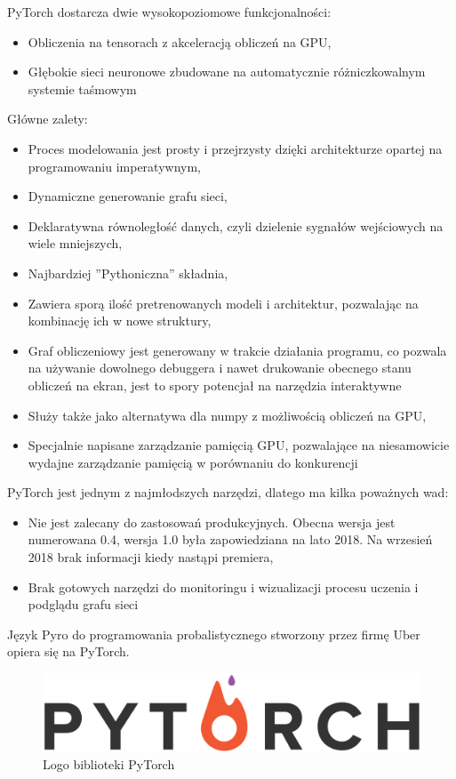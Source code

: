 \documentclass[12pt,a4paper,twoside,titlepage,openright]{book}
\begin{document}
PyTorch dostarcza dwie wysokopoziomowe funkcjonalności:
\begin{itemize}
\item Obliczenia na tensorach z akceleracją obliczeń na GPU,
\item Głębokie sieci neuronowe zbudowane na automatycznie różniczkowalnym systemie taśmowym
\end{itemize}

Główne zalety:
\begin{itemize}
\item Proces modelowania jest prosty i przejrzysty dzięki architekturze opartej na programowaniu imperatywnym,
\item Dynamiczne generowanie grafu sieci,
\item Deklaratywna równoległość danych, czyli dzielenie sygnałów wejściowych na wiele mniejszych,
\item Najbardziej ''Pythoniczna'' składnia,
\item Zawiera sporą ilość pretrenowanych modeli i architektur, pozwalając na kombinację ich w nowe struktury,
\item Graf obliczeniowy jest generowany w trakcie działania programu, co pozwala na używanie dowolnego debuggera i nawet drukowanie obecnego stanu obliczeń na ekran, jest to spory potencjał na narzędzia interaktywne
\item Służy także jako alternatywa dla numpy z możliwością obliczeń na GPU,
\item Specjalnie napisane zarządzanie pamięcią GPU, pozwalające na niesamowicie wydajne zarządzanie pamięcią w porównaniu do konkurencji
\end{itemize}

PyTorch jest jednym z najmłodszych narzędzi, dlatego ma kilka poważnych wad:
\begin{itemize}
\item Nie jest zalecany do zastosowań produkcyjnych. Obecna wersja jest numerowana 0.4, wersja 1.0 była zapowiedziana na lato 2018. Na wrzesień 2018 brak informacji kiedy nastąpi premiera,
\item Brak gotowych narzędzi do monitoringu i wizualizacji procesu uczenia i podglądu grafu sieci
\end{itemize}

Język Pyro do programowania probalistycznego stworzony przez firmę Uber opiera się na PyTorch.

\begin{figure}[h]
	\centering
			\includegraphics[resolution=100, scale=0.3]{PyTorch.png}
		\caption{Logo biblioteki PyTorch}
\end{figure}
\end{document}
